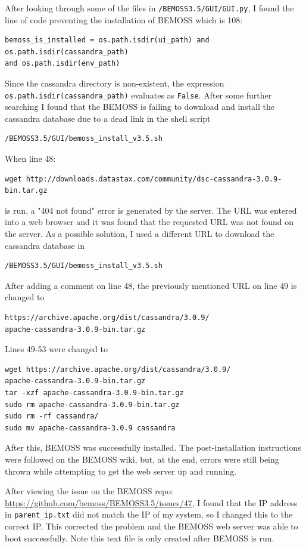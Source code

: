 \documentclass[fontsize=11pt, %
                             paper=letter, %
                             twoside, %
                             captions=tableheading,
                             index=totoc,
                             hyperref]{labbook}
\begin{document}
\begin{addmargin}[0cm]{0cm}
After looking through some of the files in \texttt{/BEMOSS3.5/GUI/GUI.py}, I found the line of code preventing the installation of BEMOSS which is 108:
\begin{verbatim}
bemoss_is_installed = os.path.isdir(ui_path) and os.path.isdir(cassandra_path) 
and os.path.isdir(env_path)
\end{verbatim}
Since the cassandra directory is non-existent, the expression \texttt{os.path.isdir(cassandra\_path)} evaluates as \texttt{False}.
\bigbreak\noindent
After some further searching I found that the BEMOSS is failing to download and install the cassandra database due to a dead link in the shell script
\begin{verbatim}
/BEMOSS3.5/GUI/bemoss_install_v3.5.sh
\end{verbatim} 
When line 48:
\begin{verbatim}
wget http://downloads.datastax.com/community/dsc-cassandra-3.0.9-bin.tar.gz
\end{verbatim} is run, a "404 not found" error is generated by the server. The URL was entered into a web browser and it was found that the requested URL was not found on the server.
\bigbreak\noindent
As a possible solution, I used a different URL to download the cassandra database in
\begin{verbatim}
/BEMOSS3.5/GUI/bemoss_install_v3.5.sh
\end{verbatim}
After adding a comment on line 48, the previously mentioned URL on line 49 is changed to
\begin{verbatim}
https://archive.apache.org/dist/cassandra/3.0.9/
apache-cassandra-3.0.9-bin.tar.gz
\end{verbatim}
Lines 49-53 were changed to
\begin{verbatim}
wget https://archive.apache.org/dist/cassandra/3.0.9/
apache-cassandra-3.0.9-bin.tar.gz
tar -xzf apache-cassandra-3.0.9-bin.tar.gz
sudo rm apache-cassandra-3.0.9-bin.tar.gz
sudo rm -rf cassandra/
sudo mv apache-cassandra-3.0.9 cassandra
\end{verbatim}  
After this, BEMOSS was successfully installed.
The post-installation instructions were followed on the BEMOSS wiki, but, at the end, errors were still being thrown while attempting to get the web server up and running.

After viewing the issue on the BEMOSS repo:
\url{https://github.com/bemoss/BEMOSS3.5/issues/47}, I found that the IP address in \texttt{parent\_ip.txt} did not match the IP of my system, so I changed this to the correct IP. This corrected the problem and the BEMOSS web server was able to boot successfully. Note this text file is only created after BEMOSS is run.


\end{addmargin}
\end{document}
